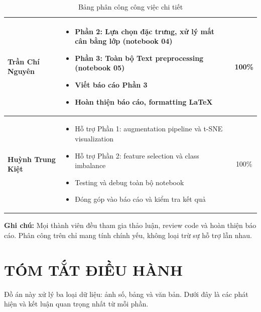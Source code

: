 \documentclass[12pt,a4paper]{article}
\let\oldtextbf\textbf
\renewcommand{\textbf}[1]{\oldtextbf{\textcolor{hcmublue}{#1}}}
\begin{document}
\begin{table}[H]
\begin{tabularx}{\textwidth}{|l|X|c|}
\textbf{Trần Chí Nguyên} &
\begin{minipage}[t]{\linewidth}
\begin{itemize}[leftmargin=*,nosep,after=\strut]
    \item[-] Phần 2: Lựa chọn đặc trưng, xử lý mất cân bằng lớp (notebook 04)
    \item[-] Phần 3: Toàn bộ Text preprocessing (notebook 05)
    \item[-] Viết báo cáo Phần 3
    \item[-] Hoàn thiện báo cáo, formatting LaTeX
\end{itemize}
\end{minipage} & 100\% \\ \hline

\textbf{Huỳnh Trung Kiệt} &
\begin{minipage}[t]{\linewidth}
\begin{itemize}[leftmargin=*,nosep,after=\strut]
    \item[-] Hỗ trợ Phần 1: augmentation pipeline và t-SNE visualization
    \item[-] Hỗ trợ Phần 2: feature selection và class imbalance
    \item[-] Testing và debug toàn bộ notebook
    \item[-] Đóng góp vào báo cáo và kiểm tra kết quả
\end{itemize}
\end{minipage} & 100\% \\ \hline
\end{tabularx}
\caption{Bảng phân công công việc chi tiết}
\label{tab:work_distribution}
\end{table}

\textbf{Ghi chú:} Mọi thành viên đều tham gia thảo luận, review code và hoàn thiện báo cáo. Phân công trên chỉ mang tính chính yếu, không loại trừ sự hỗ trợ lẫn nhau.

\section{TÓM TẮT ĐIỀU HÀNH}

Đồ án này xử lý ba loại dữ liệu: ảnh số, bảng và văn bản. Dưới đây là các phát hiện và kết luận quan trọng nhất từ mỗi phần.
\end{document}
